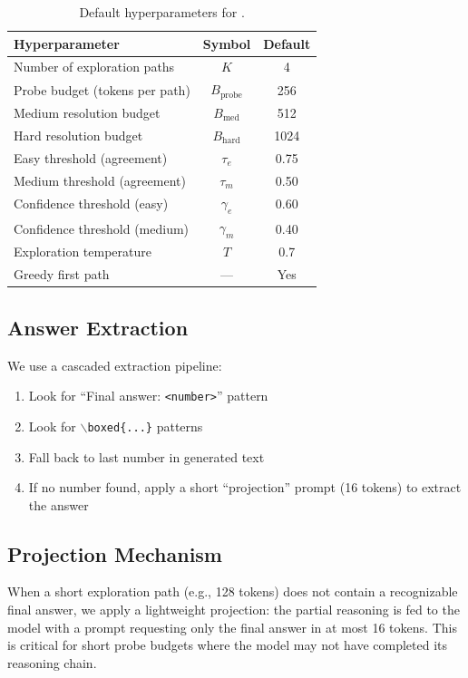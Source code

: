 \begin{table}[h]
\centering
\caption{Default hyperparameters for \method{}.}
\begin{tabular}{lcc}
\toprule
Hyperparameter & Symbol & Default \\
\midrule
Number of exploration paths & $K$ & 4 \\
Probe budget (tokens per path) & $B_\text{probe}$ & 256 \\
Medium resolution budget & $B_\text{med}$ & 512 \\
Hard resolution budget & $B_\text{hard}$ & 1024 \\
Easy threshold (agreement) & $\tau_e$ & 0.75 \\
Medium threshold (agreement) & $\tau_m$ & 0.50 \\
Confidence threshold (easy) & $\gamma_e$ & 0.60 \\
Confidence threshold (medium) & $\gamma_m$ & 0.40 \\
Exploration temperature & $T$ & 0.7 \\
Greedy first path & --- & Yes \\
\bottomrule
\end{tabular}
\end{table}

\subsection{Answer Extraction}
We use a cascaded extraction pipeline:
\begin{enumerate}[nosep]
\item Look for ``Final answer: \texttt{<number>}'' pattern
\item Look for $\backslash$\texttt{boxed\{...\}} patterns
\item Fall back to last number in generated text
\item If no number found, apply a short ``projection'' prompt (16 tokens) to extract the answer
\end{enumerate}

\subsection{Projection Mechanism}
When a short exploration path (e.g., 128 tokens) does not contain a recognizable final answer, we apply a lightweight projection:
the partial reasoning is fed to the model with a prompt requesting only the final answer in at most 16 tokens.
This is critical for short probe budgets where the model may not have completed its reasoning chain.

